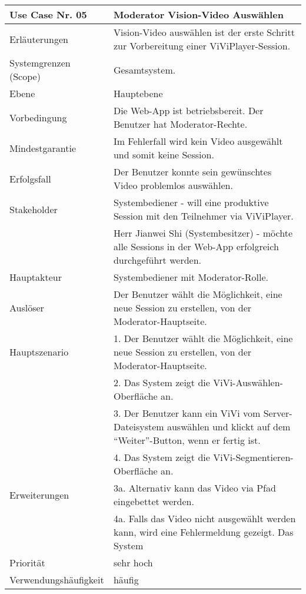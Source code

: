 \begin{tabularx}{\linewidth}{|l|X|}
	\hline
	Use Case Nr. 05			& \textbf{Moderator Vision-Video Auswählen} \\ \hline
	Erläuterungen			& Vision-Video auswählen ist der erste Schritt zur Vorbereitung 
							  einer ViViPlayer-Session. \\ \hline
	Systemgrenzen (Scope)	& Gesamtsystem. \\ \hline
	Ebene					& Hauptebene \\ \hline
	Vorbedingung			& Die Web-App ist betriebsbereit. Der Benutzer hat 
							  Moderator-Rechte. \\ \hline
	Mindestgarantie			& Im Fehlerfall wird kein Video ausgewählt und somit keine 
							  Session.\\ \hline
	Erfolgsfall 			& Der Benutzer konnte sein gewünschtes Video problemlos auswählen. 
							  \\ \hline
	Stakeholder				& Systembediener - will eine produktive Session mit den Teilnehmer 
							  via ViViPlayer. \\
							& Herr Jianwei Shi (Systembesitzer) - möchte alle Sessions in der 
							  Web-App erfolgreich durchgeführt werden. \\ \hline
	Hauptakteur				& Systembediener mit Moderator-Rolle. \\ \hline
	Auslöser				& Der Benutzer wählt die Möglichkeit, eine neue Session zu 
							  erstellen, von der Moderator-Hauptseite. \\ \hline	
	Hauptszenario			& 1. Der Benutzer wählt die Möglichkeit, eine neue Session zu 
	                          erstellen, von der Moderator-Hauptseite. \\
							& 2. Das System zeigt die ViVi-Auswählen-Oberfläche an. \\
							& 3. Der Benutzer kann ein ViVi vom Server-Dateisystem auswählen 
							  und klickt auf dem ``Weiter''-Button, wenn er fertig ist. \\
							& 4. Das System zeigt die ViVi-Segmentieren-Oberfläche an. \\ \hline
	Erweiterungen			& 3a. Alternativ kann das Video via Pfad eingebettet werden. \\ 
							& 4a. Falls das Video nicht ausgewählt werden kann, wird eine 
							  Fehlermeldung gezeigt. Das System \\ \hline
	Priorität				& sehr hoch \\ \hline
	Verwendungshäufigkeit	& häufig \\ \hline
\end{tabularx}